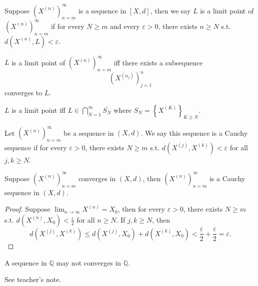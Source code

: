 \begin{definition}
    Suppose \(\left( X^{(n)} \right)_{n=m}^{\infty}  \) is a sequence in \([X, d]\), then we say \(L\) is a limit point of \(\left( X^{(n)} \right)_{n=m}^{\infty}  \) if for every \(N \ge m\) and every \(\varepsilon > 0\), there exists \(n \ge N\) s.t. \(d\left( X^{(n)}, L \right) < \varepsilon  \).        
\end{definition}

\begin{proposition}
    \(L\) is a limit point of \(\left( X^{(n)} \right)_{n=m}^{\infty}  \) iff there exists a subsequence 
    \[
        \left( X^{(n_j)} \right)_{j=1}^n 
    \]  converges to \(L\). 
\end{proposition}

\begin{proposition}
    \(L\) is a limit point iff \(L \in \bigcap_{N=1}^{\infty} \overline{S_N}  \) where \(S_N  = \left\{ X^{(K)} \right\}_{K \ge N} \). 
\end{proposition}

\begin{definition}
    Let \(\left( X^{(n)} \right)_{n=m}^{\infty}  \) be a sequence in \((X, d)\). We say this sequence is a Cauchy sequence if for every \(\varepsilon > 0\), there exists \(N \ge m\) s.t. \(d\left( X^{(j)}, X^{(k)} \right) < \varepsilon  \) for all \(j, k \ge N\).      
\end{definition}

\begin{lemma}
    Suppose \(\left( X^{(n)} \right)_{n=m}^{\infty}  \) converges in \((X, d)\), then \(\left( X^{(n)} \right)_{n=m}^{\infty}  \) is a Cauchy sequence in \((X, d)\).  
\end{lemma}
\begin{proof}
    Suppose \(\lim_{n \to \infty} X^{(n)} = X_0\), then for every \(\varepsilon > 0\), there exists \(N \ge m\) s.t. \(d\left( X^{(n)}, X_0 \right) < \frac{\varepsilon}{2}\) for all \(n \ge N\). If \(j, k \ge N\), then 
    \[
        d\left( X^{(j)}, X^{(k)} \right) \le d\left( X^{(j)}, X_0 \right) + d\left( X^{(k)}, X_0 \right) <\frac{\varepsilon}{2} + \frac{\varepsilon}{2} = \varepsilon.   
    \]      
\end{proof}

\begin{eg}
A sequence in \(\mathbb{Q} \) may not converges in \(\mathbb{Q} \).  
\end{eg}
\begin{explanation}
    See teacher's note.
\end{explanation}

